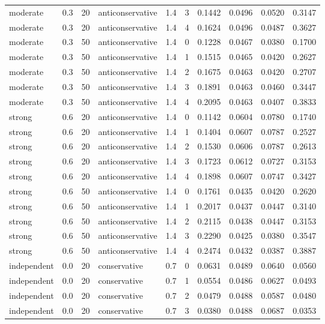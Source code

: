 \begin{table}[!htbp]
{\begin{tabular*}{\linewidth}{@{\extracolsep{\fill}}llrlrrrrrr}
moderate & 0.3 & 20 & anticonservative & 1.4 & 3 & 0.1442 & 0.0496 & 0.0520 & 0.3147 \\
moderate & 0.3 & 20 & anticonservative & 1.4 & 4 & 0.1624 & 0.0496 & 0.0487 & 0.3627 \\
moderate & 0.3 & 50 & anticonservative & 1.4 & 0 & 0.1228 & 0.0467 & 0.0380 & 0.1700 \\
moderate & 0.3 & 50 & anticonservative & 1.4 & 1 & 0.1515 & 0.0465 & 0.0420 & 0.2627 \\
moderate & 0.3 & 50 & anticonservative & 1.4 & 2 & 0.1675 & 0.0463 & 0.0420 & 0.2707 \\
moderate & 0.3 & 50 & anticonservative & 1.4 & 3 & 0.1891 & 0.0463 & 0.0460 & 0.3447 \\
moderate & 0.3 & 50 & anticonservative & 1.4 & 4 & 0.2095 & 0.0463 & 0.0407 & 0.3833 \\
strong & 0.6 & 20 & anticonservative & 1.4 & 0 & 0.1142 & 0.0604 & 0.0780 & 0.1740 \\
strong & 0.6 & 20 & anticonservative & 1.4 & 1 & 0.1404 & 0.0607 & 0.0787 & 0.2527 \\
strong & 0.6 & 20 & anticonservative & 1.4 & 2 & 0.1530 & 0.0606 & 0.0787 & 0.2613 \\
strong & 0.6 & 20 & anticonservative & 1.4 & 3 & 0.1723 & 0.0612 & 0.0727 & 0.3153 \\
strong & 0.6 & 20 & anticonservative & 1.4 & 4 & 0.1898 & 0.0607 & 0.0747 & 0.3427 \\
strong & 0.6 & 50 & anticonservative & 1.4 & 0 & 0.1761 & 0.0435 & 0.0420 & 0.2620 \\
strong & 0.6 & 50 & anticonservative & 1.4 & 1 & 0.2017 & 0.0437 & 0.0447 & 0.3140 \\
strong & 0.6 & 50 & anticonservative & 1.4 & 2 & 0.2115 & 0.0438 & 0.0447 & 0.3153 \\
strong & 0.6 & 50 & anticonservative & 1.4 & 3 & 0.2290 & 0.0425 & 0.0380 & 0.3547 \\
strong & 0.6 & 50 & anticonservative & 1.4 & 4 & 0.2474 & 0.0432 & 0.0387 & 0.3887 \\
independent & 0.0 & 20 & conservative & 0.7 & 0 & 0.0631 & 0.0489 & 0.0640 & 0.0560 \\
independent & 0.0 & 20 & conservative & 0.7 & 1 & 0.0554 & 0.0486 & 0.0627 & 0.0493 \\
independent & 0.0 & 20 & conservative & 0.7 & 2 & 0.0479 & 0.0488 & 0.0587 & 0.0480 \\
independent & 0.0 & 20 & conservative & 0.7 & 3 & 0.0380 & 0.0488 & 0.0687 & 0.0353 \\

\end{tabular*}}
\end{table}
